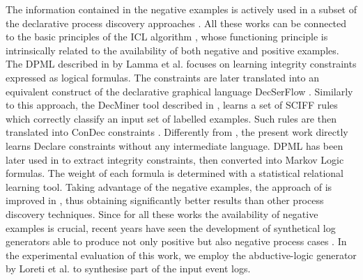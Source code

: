 \documentclass[a4wide,11pt]{article}
\newcommand{\tcolor}[2]{\color{#1}{#2}\color{black}}
\theoremstyle{definition}
\theoremstyle{plain}
\begin{document}
The information contained in the negative examples is actively used in a subset of the declarative process discovery approaches \cite{2007-Lamma,2009-Chesani,2010-Bellodi,2016-Bellodi}. All these works can be connected to the basic principles of the \ac{ICL} algorithm \cite{1995-DaRaedt}, whose functioning principle is intrinsically related to the availability of both negative and positive examples. 
The \ac{DPML} described in \cite{2007-Lamma, 2007b-Lamma} by Lamma et al. focuses on learning integrity constraints expressed as logical formulas. The constraints are later translated into an equivalent construct of the declarative graphical language DecSerFlow \cite{2006-Aalst}. Similarly to this approach, the DecMiner tool described in \cite{2009-Chesani}, learns a set of SCIFF rules \cite{2008-Alberti} which correctly classify an input set of labelled examples. Such rules are then translated into ConDec constraints \cite{2006-Pesic}. Differently from \cite{2009-Chesani}, the present work directly learns Declare constraints without any intermediate language.
\ac{DPML} has been later used in \cite{2010-Bellodi} to extract integrity constraints, then converted into Markov Logic formulas. The weight of each formula is determined with a statistical relational learning tool. %
Taking advantage of the negative examples, the approach of \cite{2010-Bellodi}  is improved in \cite{2016-Bellodi}, thus obtaining significantly better results than other process discovery techniques. 
Since for all these works the availability of negative examples is crucial, recent years have seen the development of synthetical log generators able to produce not only positive but also negative process cases \cite{2019-Chesani,2017-Chesani,2020-Loreti,2009-Goedertier, 2014-Stocker, 2010-Hee}. In the experimental evaluation of this work, we employ the abductive-logic generator by Loreti et al. \cite{2020-Loreti} to synthesise part of the input event logs.
 
\end{document}
